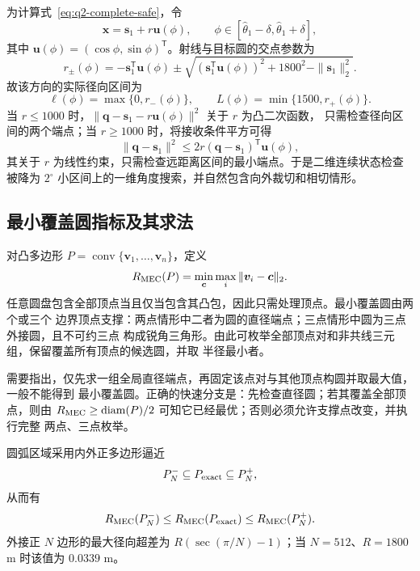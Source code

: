 为计算式~\eqref{eq:q2-complete-safe}，令
\begin{equation}
 \bm x=\bm s_1+r\bm u(\phi),\qquad
 \phi\in[\hat\theta_1-\delta,\hat\theta_1+\delta],
\end{equation}
其中 $\bm u(\phi)=(\cos\phi,\sin\phi)^{\mathsf T}$。射线与目标圆的交点参数为
\begin{equation}
 r_{\pm}(\phi)=-\bm s_1^{\mathsf T}\bm u(\phi)
 \pm\sqrt{(\bm s_1^{\mathsf T}\bm u(\phi))^2+1800^2-\|\bm s_1\|_2^2}.
 \label{eq:q2-ray-circle}
\end{equation}
故该方向的实际径向区间为
\begin{equation}
 \ell(\phi)=\max\{0,r_-(\phi)\},\qquad
 L(\phi)=\min\{1500,r_+(\phi)\}.
\end{equation}
当 $r\le1000$ 时，$\|\bm q-\bm s_1-r\bm u(\phi)\|^2$ 关于 $r$ 为凸二次函数，
只需检查径向区间的两个端点；当 $r\ge1000$ 时，将接收条件平方可得
\begin{equation}
 \|\bm q-\bm s_1\|^2
 \le2r(\bm q-\bm s_1)^{\mathsf T}\bm u(\phi),
\end{equation}
其关于 $r$ 为线性约束，只需检查远距离区间的最小端点。于是二维连续状态检查被降为
$2^\circ$ 小区间上的一维角度搜索，并自然包含向外裁切和相切情形。

\subsection{最小覆盖圆指标及其求法}

对凸多边形 $P=\operatorname{conv}\{\bm v_1,\ldots,\bm v_n\}$，定义
\begin{equation}
 R_{\rm MEC}(P)=\min_{\bm c}\max_i\|\bm v_i-\bm c\|_2.
 \label{eq:q2-mec}
\end{equation}
任意圆盘包含全部顶点当且仅当包含其凸包，因此只需处理顶点。最小覆盖圆由两个或三个
边界顶点支撑：两点情形中二者为圆的直径端点；三点情形中圆为三点外接圆，且不可约三点
构成锐角三角形。由此可枚举全部顶点对和非共线三元组，保留覆盖所有顶点的候选圆，并取
半径最小者。

需要指出，仅先求一组全局直径端点，再固定该点对与其他顶点构圆并取最大值，一般不能得到
最小覆盖圆。正确的快速分支是：先检查直径圆；若其覆盖全部顶点，则由
$R_{\rm MEC}\ge\operatorname{diam}(P)/2$ 可知它已经最优；否则必须允许支撑点改变，并执行完整
两点、三点枚举。

圆弧区域采用内外正多边形逼近
\begin{equation}
 P_N^-\subseteq P_{\rm exact}\subseteq P_N^+,
\end{equation}
从而有
\begin{equation}
 R_{\rm MEC}(P_N^-)\le R_{\rm MEC}(P_{\rm exact})
 \le R_{\rm MEC}(P_N^+).
\end{equation}
外接正 $N$ 边形的最大径向超差为
$R(\sec(\pi/N)-1)$；当 $N=512$、$R=1800$ m 时该值为 $0.0339$ m。

